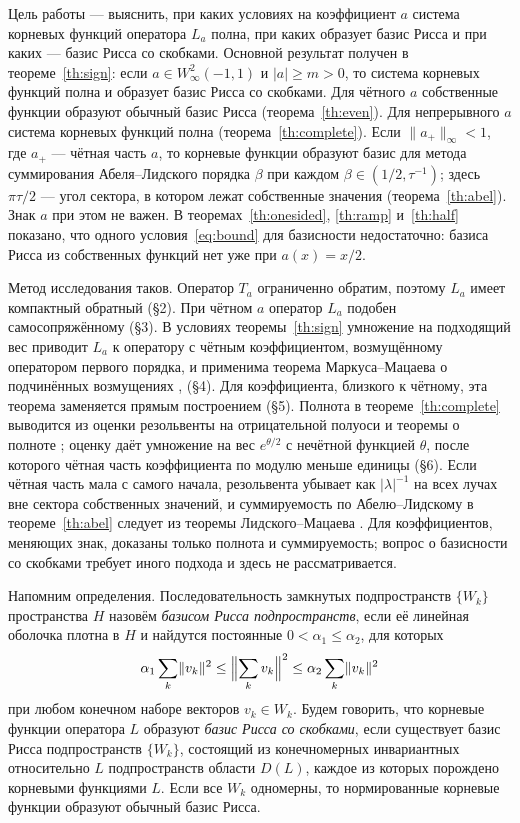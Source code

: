 \documentclass[12pt,a4paper]{article}
\theoremstyle{definition}
\newcommand{\norm}[1]{\lVert#1\rVert}
\newcommand{\abs}[1]{\lvert#1\rvert}
\begin{document}
Цель работы --- выяснить, при каких условиях на коэффициент $a$ система корневых функций
оператора $L_a$ полна, при каких образует базис Рисса и при каких --- базис Рисса со
скобками. Основной результат получен в теореме~\ref{th:sign}: если
$a\in W^2_\infty(-1,1)$ и $\abs a\ge m>0$, то система корневых функций полна и образует
базис Рисса со скобками. Для чётного $a$ собственные функции образуют обычный базис Рисса
(теорема~\ref{th:even}). Для непрерывного $a$ система корневых функций полна
(теорема~\ref{th:complete}). Если $\norm{a_+}_\infty<1$, где $a_+$ --- чётная часть
$a$, то корневые функции образуют базис для метода суммирования Абеля--Лидского порядка
$\beta$ при каждом $\beta\in(1/2,\tau^{-1})$; здесь $\pi\tau/2$ --- угол сектора, в
котором лежат собственные значения (теорема~\ref{th:abel}). Знак $a$ при этом не
важен. В теоремах~\ref{th:onesided}, \ref{th:ramp}
и~\ref{th:half} показано, что одного условия~\eqref{eq:bound} для базисности
недостаточно: базиса Рисса из собственных функций нет уже при $a(x)=x/2$.

Метод исследования таков. Оператор $T_a$ ограниченно обратим, поэтому $L_a$ имеет
компактный обратный (\S2). При чётном $a$ оператор $L_a$ подобен самосопряжённому (\S3).
В условиях теоремы~\ref{th:sign} умножение на подходящий вес приводит $L_a$ к оператору с
чётным коэффициентом, возмущённому оператором первого порядка, и применима теорема
Маркуса--Мацаева о подчинённых возмущениях \cite[теорема~6.1]{Wyss},
\cite[теорема~6.6]{Shk} (\S4). Для коэффициента, близкого к чётному, эта теорема
заменяется прямым построением (\S5). Полнота в теореме~\ref{th:complete} выводится из
оценки резольвенты на отрицательной полуоси и теоремы о полноте
\cite[теорема~4.7]{Shk}; оценку даёт умножение на вес $e^{\theta/2}$ с нечётной функцией
$\theta$, после которого чётная часть коэффициента по модулю меньше единицы (\S6). Если
чётная часть мала с самого начала, резольвента убывает как $\abs\lambda^{-1}$ на всех
лучах вне сектора собственных значений, и суммируемость по Абелю--Лидскому в
теореме~\ref{th:abel} следует из теоремы Лидского--Мацаева \cite[теорема~5.1]{Shk}. Для
коэффициентов, меняющих знак, доказаны только полнота и суммируемость; вопрос о
базисности со скобками требует иного подхода и здесь не рассматривается.

Напомним определения. Последовательность замкнутых подпространств $\{W_k\}$ пространства
$H$ назовём \emph{базисом Рисса подпространств}, если её линейная оболочка плотна в $H$ и
найдутся постоянные $0<\alpha_1\le\alpha_2$, для которых
\[
 \alpha_1\sum_k\norm{v_k}^2\le\Bigl\lVert\sum_kv_k\Bigr\rVert^2\le\alpha_2\sum_k\norm{v_k}^2
\]
при любом конечном наборе векторов $v_k\in W_k$. Будем говорить, что корневые функции
оператора $L$ образуют \emph{базис Рисса со скобками}, если существует базис Рисса
подпространств $\{W_k\}$, состоящий из конечномерных инвариантных относительно $L$
подпространств области $D(L)$, каждое из которых порождено корневыми функциями $L$. Если
все $W_k$ одномерны, то нормированные корневые функции образуют обычный базис Рисса.
\end{document}
